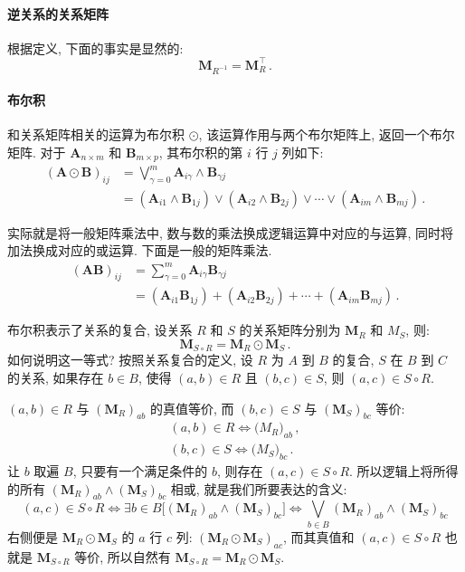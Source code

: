 \documentclass[UTF8]{ctexart}
\theoremstyle{mystyle}
\theoremstyle{myremark}
\theoremstyle{plain}
\newcommand{\ve}[1]{\boldsymbol{\mathbf{#1}}}
\begin{document}
\paragraph{逆关系的关系矩阵}
根据定义, 下面的事实是显然的:
\[ 
    \ve M_{R^{-1}} = \ve M_R^\top \,.
\]

\paragraph{布尔积}
和关系矩阵相关的运算为布尔积 $ \odot $, 该运算作用与两个布尔矩阵上, 返回一个布尔矩阵. 对于 $ \ve A_{n \times m} $ 和 $ \ve B_{m \times p} $, 其布尔积的第 $ i $ 行 $ j $ 列如下:
\begin{align*}
    (\ve A \odot \ve B)_{ij} &= \bigvee_{\gamma = 0}^{m} \ve A_{i \gamma} \land \ve B_{\gamma j} \\
    &= (\ve A_{i1} \land \ve B_{1j}) \lor (\ve A_{i2} \land \ve B_{2j}) \lor \cdots \lor (\ve A_{im} \land \ve B_{mj}) \,.
\end{align*}

实际就是将一般矩阵乘法中, 数与数的乘法换成逻辑运算中对应的与运算, 同时将加法换成对应的或运算. 下面是一般的矩阵乘法.
\begin{align*}
    (\ve A \ve B)_{ij} &= \sum_{\gamma = 0}^{m} \ve A_{i \gamma} \ve B_{\gamma j} \\
    &= (\ve A_{i1} \ve B_{1j}) + (\ve A_{i2} \ve B_{2j}) + \cdots + (\ve A_{im} \ve B_{mj}) \,.
\end{align*}

布尔积表示了关系的复合, 设关系 $ R $ 和 $ S $ 的关系矩阵分别为 $ \ve M_R $ 和 $ M_S $, 则:
\[ 
    \ve M_{S \circ R} = \ve M_R \odot \ve M_S \,.
\]
如何说明这一等式? 按照关系复合的定义, 设 $ R $ 为 $ A $ 到 $ B $ 的复合, $ S $ 在 $ B $ 到 $ C $ 的关系, 如果存在 $ b \in B $, 使得 $ (a, b) \in R $ 且 $ (b, c) \in S $, 则 $ (a, c) \in S \circ R $.

$ (a, b) \in R $ 与 $ (\ve M_R)_{ab} $ 的真值等价, 而 $ (b, c) \in S $ 与 $ (\ve M_S)_{bc} $ 等价:
\[ \begin{array}{c}
    (a, b) \in R \iff \ve (M_R)_{ab} \,,\\
    (b, c) \in S \iff \ve (M_S)_{bc} \,.
\end{array} \] 
让 $ b $ 取遍 $ B $, 只要有一个满足条件的 $ b $, 则存在 $ (a, c) \in S \circ R $. 所以逻辑上将所得的所有 $ (\ve M_R)_{ab} \land (\ve M_S)_{bc} $ 相或, 就是我们所要表达的含义:
\[ 
    (a, c) \in S \circ R \iff \exists b \in B \bigl[ (\ve M_R)_{ab} \land (\ve M_S)_{bc} \bigr] \iff \bigvee_{b \in B} (\ve M_R)_{ab} \land (\ve M_S)_{bc}
\]
右侧便是 $ \ve M_R \odot \ve M_S $ 的 $ a $ 行 $ c $ 列: $ (\ve M_R \odot \ve M_S)_{ac} $, 而其真值和 $ (a, c) \in S \circ R $ 也就是 $ \ve M_{S \circ R} $ 等价, 所以自然有 $ \ve M_{S \circ R} = \ve M_R \odot \ve M_S $.
\end{document}
